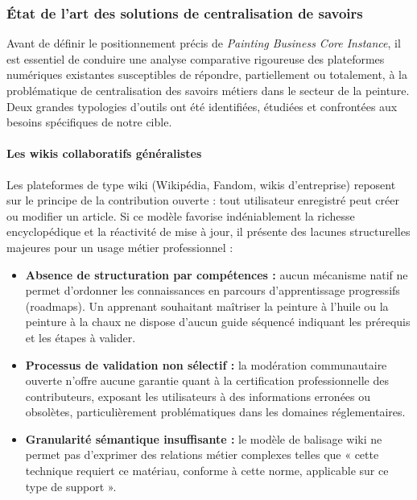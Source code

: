 \documentclass[12pt,a4paper]{report}
\begin{document}
\subsubsection*{État de l'art des solutions de centralisation de savoirs}

\noindent
Avant de définir le positionnement précis de \textit{Painting Business Core Instance}, il est essentiel de conduire une analyse comparative rigoureuse des plateformes numériques existantes susceptibles de répondre, partiellement ou totalement, à la problématique de centralisation des savoirs métiers dans le secteur de la peinture. Deux grandes typologies d'outils ont été identifiées, étudiées et confrontées aux besoins spécifiques de notre cible.

\paragraph{Les wikis collaboratifs généralistes}

\noindent
Les plateformes de type wiki (Wikipédia, Fandom, wikis d'entreprise) reposent sur le principe de la contribution ouverte : tout utilisateur enregistré peut créer ou modifier un article. Si ce modèle favorise indéniablement la richesse encyclopédique et la réactivité de mise à jour, il présente des lacunes structurelles majeures pour un usage métier professionnel :

\begin{itemize}[leftmargin=1.5cm, itemsep=4pt]
    \item \textbf{Absence de structuration par compétences :} aucun mécanisme natif ne permet d'ordonner les connaissances en parcours d'apprentissage progressifs (roadmaps). Un apprenant souhaitant maîtriser la peinture à l'huile ou la peinture à la chaux ne dispose d'aucun guide séquencé indiquant les prérequis et les étapes à valider.
    \item \textbf{Processus de validation non sélectif :} la modération communautaire ouverte n'offre aucune garantie quant à la certification professionnelle des contributeurs, exposant les utilisateurs à des informations erronées ou obsolètes, particulièrement problématiques dans les domaines réglementaires.
    \item \textbf{Granularité sémantique insuffisante :} le modèle de balisage wiki ne permet pas d'exprimer des relations métier complexes telles que « cette technique requiert ce matériau, conforme à cette norme, applicable sur ce type de support ».
\end{itemize}
\end{document}
